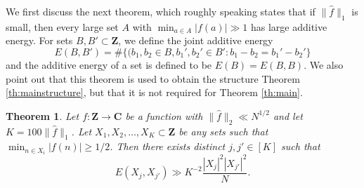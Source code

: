 \documentclass[11pt, reqno]{amsart}
\newtheorem{theorem}{Theorem}[section]
\begin{document}
\medskip

We first discuss the next theorem, which roughly speaking states that if $\lVert \hat{f}\rVert_1$ is small, then every large set $A$ with $\min_{a\in A}|f(a)|\gg 1$ has large additive energy. For sets $B,B'\subset\mathbf{Z}$, we define the joint additive energy $$E(B,B')=\#\{(b_1,b_2\in B, b_1',b_2'\in B':b_1-b_2=b_1'-b_2'\}$$ and the additive energy of a set is defined to be $E(B)=E(B,B)$. We also point out that this theorem is used to obtain the structure Theorem \ref{th:mainstructure}, but that it is not required for Theorem \ref{th:main}. 
\begin{theorem}\label{th:smallL^1largeenergy}
    Let $f:\mathbf{Z}\to\mathbf{C}$ be a function with $\lVert \hat{f}\rVert_2\ll N^{1/2}$ and let $K=100\lVert \hat{f}\rVert_1$. Let $X_1,X_2,\dots,X_K\subset \mathbf{Z}$ be any sets such that $\min_{n\in X_i}|f(n)|\geqslant 1/2$. Then there exists distinct $j,j'\in[K]$ such that
    \begin{equation}\label{largeenergythm}
       E(X_j,X_{j'})\gg K^{-2}\frac{|X_j|^2|X_{j'}|^2}{N}. 
    \end{equation}
\end{theorem}
\end{document}
